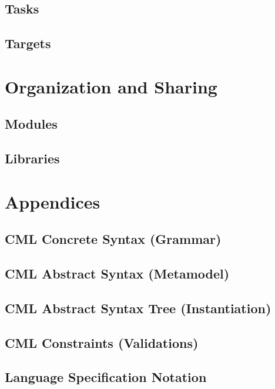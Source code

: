 \documentclass[a4paper,oneside,12pt, extrafontsizes]{memoir}
\begin{document}
\chapter{Tasks}
\label{sec:tasks}

\chapter{Targets}
\label{sec:targets}

\part{Organization and Sharing}

\chapter{Modules}
\label{ch:modules}

\chapter{Libraries}
\label{ch:libraries}

\part{Appendices}

\appendix

\chapter{CML Concrete Syntax (Grammar)}
\label{apx:concrete-syntax}


\chapter{CML Abstract Syntax (Metamodel)}
\label{apx:abstract-syntax}


\chapter{CML Abstract Syntax Tree (Instantiation)}
\label{apx:ast}


\chapter{CML Constraints (Validations)}
\label{apx:ocl}


\chapter{Language Specification Notation}
\label{apx:lsl}


\backmatter



\end{document}

